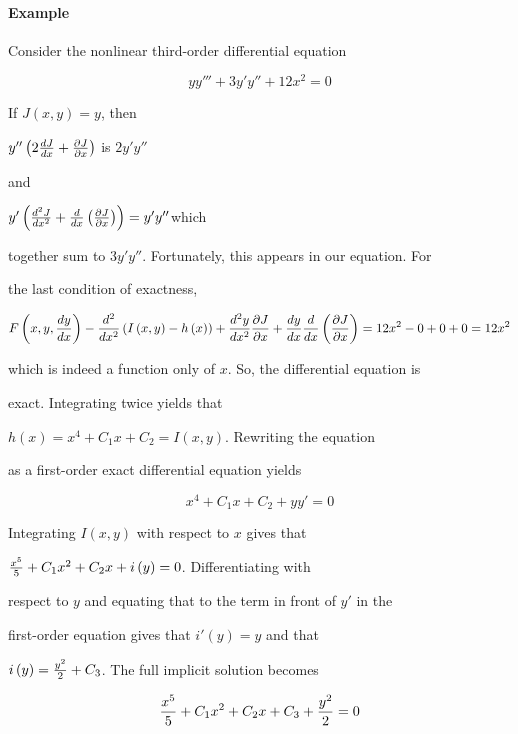 \paragraph{Example}



Consider the nonlinear third-order differential equation



$$yy'''+3y'y''+12x^2=0$$



If $J\left(x,y\right)=y$, then

$y''\left(2{dJ \over dx}+{\partial J\over\partial x}\right)$ is $2y'y''$

and

$y'\left({d^2J \over dx^2}+{d \over dx}\left({\partial J\over\partial x}\right)\right)=y'y''$which

together sum to $3y'y''$. Fortunately, this appears in our equation. For

the last condition of exactness,



$$F\left(x,y,{dy \over dx}\right)-{d^2 \over dx^2}\left(I\left(x,y\right)-h\left(x\right)\right)+{d^2y \over dx^2}{\partial J\over\partial x}+{dy \over dx}{d \over dx}\left({\partial J\over\partial x}\right)=12x^2-0+0+0=12x^2$$



which is indeed a function only of $x$. So, the differential equation is

exact. Integrating twice yields that

$h\left(x\right)=x^4+C_1x+C_2=I\left(x,y\right)$. Rewriting the equation

as a first-order exact differential equation yields



$$x^4+C_1x+C_2+yy'=0$$



Integrating $I\left(x,y\right)$ with respect to $x$ gives that

${x^5\over 5}+C_1x^2+C_2x+i\left(y\right)=0$. Differentiating with

respect to $y$ and equating that to the term in front of $y'$ in the

first-order equation gives that $i'\left(y\right)=y$ and that

$i\left(y\right)={y^2\over 2}+C_3$. The full implicit solution becomes



$${x^5\over 5}+C_1x^2+C_2x+C_3+{y^2\over 2}=0$$




